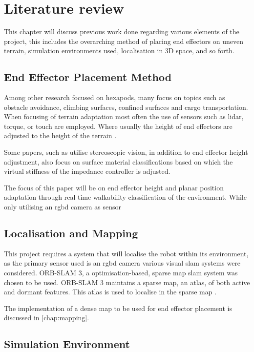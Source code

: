 \chapter{Literature review}
This chapter will discuss previous work done regarding various elements of the project, this includes the overarching method of placing end effectors on
uneven terrain, simulation environments used, localisation in 3D space, and so forth.

\section{End Effector Placement Method}

Among other research focused on hexapods, many focus on topics such as obstacle avoidance, climbing surfaces, confined surfaces and cargo transportation.
When focusing of terrain adaptation most often the use of sensors such as \ac{lidar}, torque, or touch are employed. Where usually the height of end effectors
are adjusted to the height of the terrain \cite{coelho2021trends}.

Some papers, such as \cite{homberger2017terrain} utilise stereoscopic vision, in addition to end effector height adjustment, also focus on surface material classifications based on which the virtual
stiffness of the impedance controller is adjusted.

The focus of this paper will be on end effector height and planar position adaptation through real time walkability classification of the environment. 
While only utilising an \ac{rgbd} camera as sensor

\section{Localisation and Mapping}

This project requires a system that will localise the robot within its environment, as the primary sensor used is an \ac{rgbd} camera various visual \ac{slam} systems 
were considered. ORB-SLAM 3, a optimisation-based, sparse map \ac{slam} system was chosen to be used. ORB-SLAM 3 maintains a sparse map, an atlas, of both active and
dormant features. This atlas is used to localise in the sparse map \citep{macario2022comprehensive}.

The implementation of a dense map to be used for end effector placement is discussed in \autoref{chap:mapping}.

\section{Simulation Environment}

